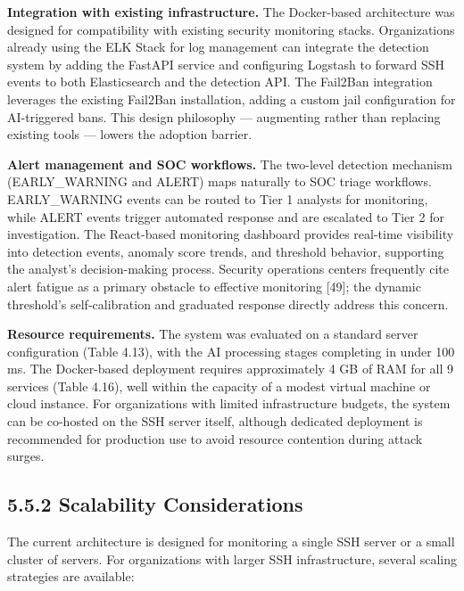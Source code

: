 \documentclass[
  a4paper]{report}
\begin{document}
\textbf{Integration with existing infrastructure.} The Docker-based
architecture was designed for compatibility with existing security
monitoring stacks. Organizations already using the ELK Stack for log
management can integrate the detection system by adding the FastAPI
service and configuring Logstash to forward SSH events to both
Elasticsearch and the detection API. The Fail2Ban integration leverages
the existing Fail2Ban installation, adding a custom jail configuration
for AI-triggered bans. This design philosophy --- augmenting rather than
replacing existing tools --- lowers the adoption barrier.

\textbf{Alert management and SOC workflows.} The two-level detection
mechanism (EARLY\_WARNING and ALERT) maps naturally to SOC triage
workflows. EARLY\_WARNING events can be routed to Tier 1 analysts for
monitoring, while ALERT events trigger automated response and are
escalated to Tier 2 for investigation. The React-based monitoring
dashboard provides real-time visibility into detection events, anomaly
score trends, and threshold behavior, supporting the analyst's
decision-making process. Security operations centers frequently cite
alert fatigue as a primary obstacle to effective monitoring {[}49{]};
the dynamic threshold's self-calibration and graduated response directly
address this concern.

\textbf{Resource requirements.} The system was evaluated on a standard
server configuration (Table 4.13), with the AI processing stages
completing in under 100 ms. The Docker-based deployment requires
approximately 4 GB of RAM for all 9 services (Table 4.16), well within
the capacity of a modest virtual machine or cloud instance. For
organizations with limited infrastructure budgets, the system can be
co-hosted on the SSH server itself, although dedicated deployment is
recommended for production use to avoid resource contention during
attack surges.

\subsection{5.5.2 Scalability
Considerations}\label{scalability-considerations}

The current architecture is designed for monitoring a single SSH server
or a small cluster of servers. For organizations with larger SSH
infrastructure, several scaling strategies are available:
\end{document}
